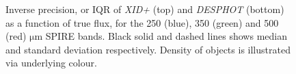 \documentclass[useAMS,usenatbib]{mnras}
\begin{document}
\begin{figure}
\caption{Inverse precision, or IQR of \emph{XID+} (top) and \emph{DESPHOT} (bottom) as a function of true flux, for the 250 (blue), 350 (green) and 500 (red) $\mathrm{\mu m}$ SPIRE bands. Black solid and dashed lines shows median and standard deviation respectively. Density of objects is illustrated via underlying colour. }\label{fig:precision}
\end{figure}
\end{document}
